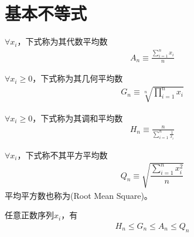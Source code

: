 
\chapter{基本不等式}
\label{chap:basic-inequalities}

\begin{definition}
  $\forall x_i$，下式称为其代数平均数
  \begin{align*}
    A_n\equiv\frac{\sum\limits_{i=1}^{n} x_i}{n}
  \end{align*}
\end{definition}

\begin{definition}
  $\forall x_i\ge0$，下式称为其几何平均数
  \begin{align*}
    G_n\equiv\sqrt[n]{\prod_{i=1}^{n}x_i}
  \end{align*}
\end{definition}

\begin{definition}
  $\forall x_i\ge0$，下式称为其调和平均数
  \begin{align*}
    H_n\equiv\frac{n}{\sum\limits_{i=1}^{n}\frac1{x_i}}
  \end{align*}
\end{definition}

\begin{definition}
  $\forall x_i$，下式称不其平方平均数
  \begin{align*}
    Q_n\equiv\sqrt{\dfrac{\sum\limits_{i=1}^n x_i^2}{n}}
  \end{align*}
  平均平方数也称为(Root Mean Square)。
\end{definition}

\begin{theorem}[HM-GM-AM-QM]
  任意正数序列$x_i$，有
  \begin{align*}
    H_n\le G_n\le A_n\le Q_n
  \end{align*}
\end{theorem}

